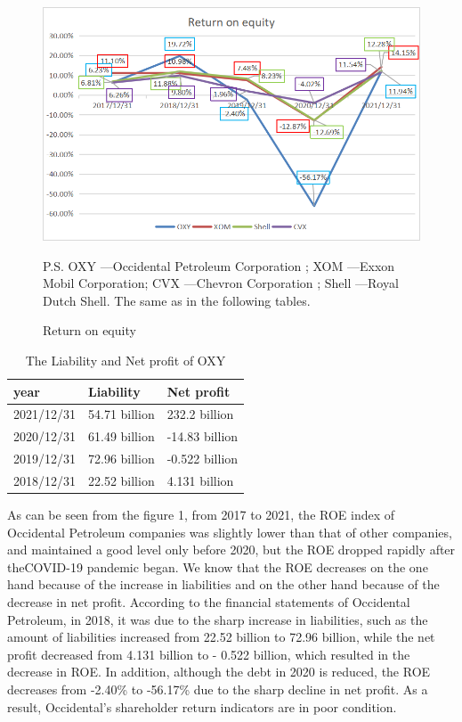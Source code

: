 \documentclass[
	a4paper, %
	12pt,%
]{CSSullivanBusinessReport}
\begin{document}
\begin{fullwidth}
\begin{figure}[h]
    \centering
    \includegraphics[width=15cm]{Images/return on equity.png}
    \caption{Return on equity}
    P.S. OXY —Occidental Petroleum Corporation ; XOM —Exxon Mobil Corporation; CVX —Chevron Corporation ; Shell —Royal Dutch Shell. The same as in the following tables.
    \label{return on equity}
\end{figure}
\begin{table}[!ht]
    \centering
    \caption{The Liability and Net profit of OXY}
    \begin{tabular}{l|ll}
    \hline
        year & Liability & Net profit  \\ \hline
        2021/12/31 & 54.71 billion & 232.2 billion  \\ 
        2020/12/31 & 61.49 billion & -14.83 billion  \\ 
        2019/12/31 & 72.96 billion & -0.522 billion  \\ 
        2018/12/31 & 22.52 billion & 4.131 billion  \\ \hline
    \end{tabular}
\end{table}
\par
As can be seen from the figure 1, from 2017 to 2021, the ROE index of Occidental Petroleum companies was slightly lower than that of other companies, and maintained a good level only before 2020, but the ROE dropped rapidly after theCOVID-19 pandemic began. We know that the ROE decreases on the one hand because of the increase in liabilities and on the other hand because of the decrease in net profit. According to the financial statements of Occidental Petroleum, in 2018, it was due to the sharp increase in liabilities, such as the amount of liabilities increased from 22.52 billion to 72.96 billion, while the net profit decreased from 4.131 billion to - 0.522 billion, which resulted in the decrease in ROE. In addition, although the debt in 2020 is reduced, the ROE decreases from -2.40\% to -56.17\% due to the sharp decline in net profit. As a result, Occidental's shareholder return indicators are in poor condition.


\end{fullwidth}
\end{document}
